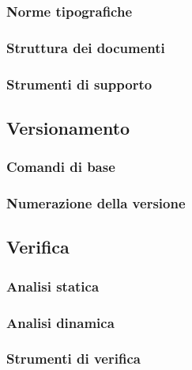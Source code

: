 		\subsubsection{Norme tipografiche}

		\subsubsection{Struttura dei documenti}

		\subsubsection{Strumenti di supporto}

	\subsection{Versionamento}
		\subsubsection{Comandi di base}

		\subsubsection{Numerazione della versione}
		\label{3.2.2}

	\subsection{Verifica}
		\subsubsection{Analisi statica}

		\subsubsection{Analisi dinamica}

		\subsubsection{Strumenti di verifica}